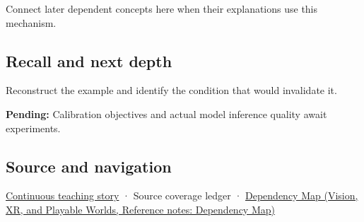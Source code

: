 Connect later dependent concepts here when their explanations use this mechanism.

\subsection{Recall and next depth}\label{appendix-d5da3eaabaef-recall-and-next-depth}

Reconstruct the example and identify the condition that would invalidate it.

\textbf{Pending:} Calibration objectives and actual model inference quality await experiments.

\subsection{Source and navigation}\label{appendix-d5da3eaabaef-source-and-navigation}

\hyperref[01-foundations-i-ch001-choosing-what-information-to-keep]{Continuous teaching story} · {Source coverage ledger} · \href{../07-Vision-XR-and-Playable-Worlds/main.pdf\#nameddest=appendix-4ad47bdd269a}{Dependency Map (Vision, XR, and Playable Worlds, Reference notes: Dependency Map)}

